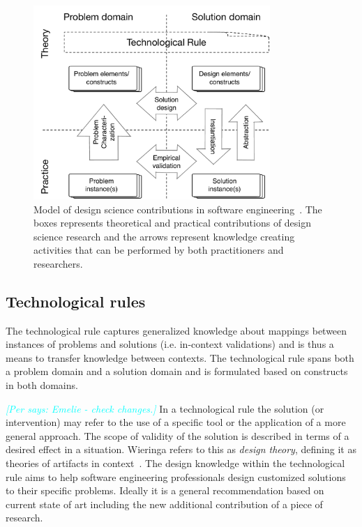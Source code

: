 \documentclass[graybox]{svmult}
\newcommand{\per}[1]{\textcolor{cyan}{{\it [Per says: #1]}}}
\newcommand{\per}[1]{}
\begin{document}
\begin{figure}
  \includegraphics[width=0.8\textwidth]{Figures/DS_model.pdf}
\caption{Model of design science contributions in software engineering~\cite{Engstrom19arxiv}. The boxes represents theoretical and practical contributions of design science research and the arrows represent knowledge creating activities that can be performed by both practitioners and researchers.}
\label{fig:DS_model}       %
\end{figure}



\subsection{Technological rules}
\label{sec:technologicalrules}



The technological rule captures generalized knowledge about mappings between instances of problems and solutions (i.e. in-context validations) and is thus a means to transfer knowledge between contexts. The technological rule spans both a problem domain and a solution domain and is formulated based on constructs in both domains. 

\per{Emelie - check changes.}
In a technological rule the solution (or intervention) may refer to the use of a specific tool or the application of a more general approach. The scope of validity of the solution is described in terms of a desired effect in a situation.  Wieringa refers to this as \emph{design theory}, defining it as theories of artifacts in context~\cite{wieringa_design_2009}. The design knowledge within the technological rule aims to help software engineering professionals design customized solutions to their specific problems. Ideally it is a general recommendation based on current state of art including the new additional contribution of a piece of research.
\end{document}
